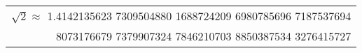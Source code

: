 \begin{table}
\begin{center}
\begin{tabular}{r}
$\sqrt 2 \approx $ \ttfamily\footnotesize 
1.4142135623 7309504880 1688724209 6980785696 7187537694 \\ \ttfamily\footnotesize
8073176679 7379907324 7846210703 8850387534 3276415727 \\

\end{tabular}
\end{center}
\end{table}
